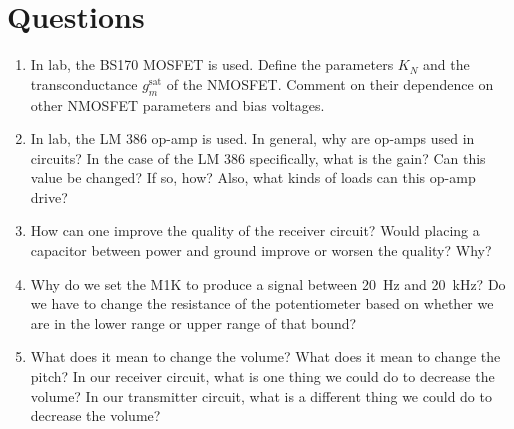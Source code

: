 \documentclass[12pt]{../manual}
\begin{document}
\newpage
\section{Questions}
\begin{enumerate}
\item In lab, the BS170 MOSFET is used. Define the parameters $K_N$ and the transconductance $g_m^\mathrm{sat}$ of the NMOSFET. Comment on their dependence on other NMOSFET parameters and bias voltages.
\item In lab, the LM 386 op-amp is used. In general, why are op-amps used in circuits? In the case of the LM 386 specifically, what is the gain? Can this value be changed? If so, how? Also, what kinds of loads can this op-amp drive? 
\item How can one improve the quality of the receiver circuit? Would placing a capacitor between power and ground improve or worsen the quality? Why?
\item Why do we set the M1K to produce a signal between \SI{20}{\hertz} and \SI{20}{\kilo\hertz}? Do we have to change the resistance of the potentiometer based on whether we are in the lower range or upper range of that bound?
\item What does it mean to change the volume? What does it mean to change the pitch? In our receiver circuit, what is one thing we could do to decrease the volume? In our transmitter circuit, what is a different thing we could do to decrease the volume?
\end{enumerate}
\end{document}
